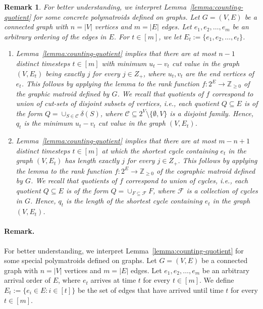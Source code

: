 \documentclass[11pt]{article}
\newtheorem{remark}{Remark}
\theoremstyle{definition}
\newcommand{\Z}{\mathbb{Z}}
\begin{document}
\begin{remark}
    For better understanding, we interpret Lemma~\ref{lemma:counting-quotient} for some concrete polymatroids defined on graphs. Let $G=(V,E)$ be a connected graph with $n=|V|$ vertices and $m=|E|$ edges. Let $e_1, e_2, \ldots, e_m$ be an arbitrary ordering of the edges in $E$. For $t\in [m]$, we let $E_t:=\{e_1, e_2, \ldots, e_t\}$.
    \begin{enumerate}
        \item Lemma~\ref{lemma:counting-quotient} implies that there are at most $n-1$ distinct timesteps $t\in [m]$ with minimum $u_t-v_t$ cut value in the graph $(V, E_t)$ being exactly $j$ for every $j\in Z_+$, where $u_t, v_t$ are the end vertices of $e_t$. This follows by applying the lemma to the rank function $f: 2^E\rightarrow \Z_{\ge 0}$ of the graphic matroid defined by $G$. We recall that quotients of $f$ correspond to union of cut-sets of disjoint subsets of vertices, i.e., each quotient $Q\subseteq E$ is of the form $Q=\cup_{S\in \mathcal{C}}\delta(S)$, where $\mathcal{C}\subseteq 2^V\setminus \{\emptyset, V\}$ is a disjoint family. Hence, $q_t$ is the minimum $u_t-v_t$ cut value in the graph $(V, E_t)$.
        
        \item Lemma~\ref{lemma:counting-quotient} implies that there are at most $m-n+1$ distinct timesteps $t\in [m]$ at which the shortest cycle containing $e_t$ in the graph $(V, E_t)$ has length exactly $j$ for every $j\in Z_+$. This follows by applying the lemma to the rank function $f: 2^E\rightarrow \Z_{\ge 0}$ of the cographic matroid defined by $G$. We recall that quotients of $f$ correspond to union of cycles, i.e., each quotient $Q\subseteq E$ is of the form $Q=\cup_{F\subseteq \mathcal{F}}F$, where $\mathcal{F}$ is a collection of cycles in $G$. Hence, $q_t$ is the length of the shortest cycle containing $e_t$ in the graph $(V, E_t)$. 
    \end{enumerate}
\end{remark}

\iffalse
\paragraph{Remark.} For better understanding, we interpret Lemma~\ref{lemma:counting-quotient} for some special polymatroids defined on graphs. Let $G=(V,E)$ be a connected graph with $n=|V|$ vertices and $m=|E|$ edges. Let $e_1, e_2, \ldots, e_m$ be an arbitrary arrival order of $E$, where $e_t$ arrives at time $t$ for every $t\in [m]$. We define $E_t:=\{e_i\in E: i\in [t]\}$ be the set of edges that have arrived until time $t$ for every $t\in [m]$.
\end{document}
